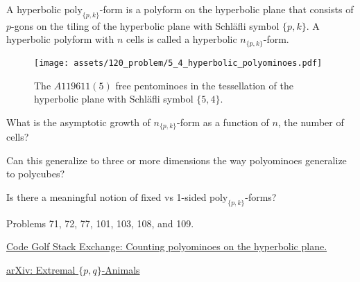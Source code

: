 \documentclass{article}
\begin{document}
A hyperbolic $\mathrm{poly}_{\{p,k\}}$-form is a polyform on the hyperbolic plane that
consists of $p$-gons on the tiling of the hyperbolic plane with Schl\"afli
symbol $\{p,k\}$.
A hyperbolic polyform with $n$ cells is called a hyperbolic $n_{\{p,k\}}$-form.

\begin{figure}[ht!]
  \centering
  \texttt{[image: assets/120\_problem/5\_4\_hyperbolic\_polyominoes.pdf]}
  \caption{
    The $A119611(5)$ free pentominoes in the tessellation of the
    hyperbolic plane with Schl\"afli symbol $\{5,4\}$.
  }
\end{figure}

\begin{question}
  What is the asymptotic growth of $n_{\{p,k\}}$-form as a function of $n$,
  the number of cells?
\end{question}

\begin{related}
  \item Can this generalize to three or more dimensions the way polyominoes
  generalize to polycubes?
  \item Is there a meaningful notion of fixed vs 1-sided
    $\mathrm{poly}_{\{p,k\}}$-forms?
\end{related}


\begin{references}
  \item Problems 71, 72, 77, 101, 103, 108, and 109.
  \item \href{https://codegolf.stackexchange.com/q/200122/53884}{Code Golf Stack Exchange: Counting polyominoes on the hyperbolic plane.}
  \item \href{https://arxiv.org/abs/2109.05331}{arXiv: Extremal $\{p,q\}$-Animals}
\end{references}
\end{document}
